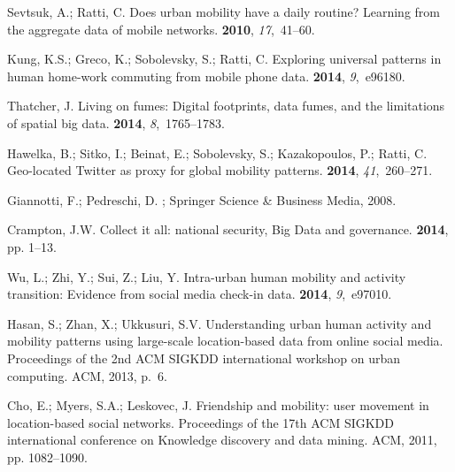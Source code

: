 \documentclass[ijgi,article,accept,moreauthors,pdftex,10pt,a4paper]{mdpi}
\theoremstyle{mdpi}
\newcounter{ex}
\newcounter{re}
\theoremstyle{mdpidefinition}
\begin{document}
\begin{thebibliography}{-------}
Sevtsuk, A.; Ratti, C.
\newblock Does urban mobility have a daily routine? Learning from the aggregate
  data of mobile networks.
 {\bf 2010}, {\em 17},~41--60.

Kung, K.S.; Greco, K.; Sobolevsky, S.; Ratti, C.
\newblock Exploring universal patterns in human home-work commuting from mobile
  phone data.
 {\bf 2014}, {\em 9},~e96180.

Thatcher, J.
\newblock Living on fumes: Digital footprints, data fumes, and the limitations
  of spatial big data.
 {\bf 2014}, {\em
  8},~1765--1783.

Hawelka, B.; Sitko, I.; Beinat, E.; Sobolevsky, S.; Kazakopoulos, P.; Ratti, C.
\newblock Geo-located Twitter as proxy for global mobility patterns.
 {\bf 2014}, {\em
  41},~260--271.

Giannotti, F.; Pedreschi, D.
; Springer Science \& Business Media,  2008.

Crampton, J.W.
\newblock Collect it all: national security, Big Data and governance.
 {\bf 2014}, pp. 1--13.

Wu, L.; Zhi, Y.; Sui, Z.; Liu, Y.
\newblock Intra-urban human mobility and activity transition: Evidence from
  social media check-in data.
 {\bf 2014}, {\em 9},~e97010.

Hasan, S.; Zhan, X.; Ukkusuri, S.V.
\newblock Understanding urban human activity and mobility patterns using
  large-scale location-based data from online social media.
\newblock  Proceedings of the 2nd ACM SIGKDD international workshop on urban
  computing. ACM,  2013, p.~6.

Cho, E.; Myers, S.A.; Leskovec, J.
\newblock Friendship and mobility: user movement in location-based social
  networks.
\newblock  Proceedings of the 17th ACM SIGKDD international conference on
  Knowledge discovery and data mining. ACM,  2011, pp. 1082--1090.


\end{thebibliography}
\end{document}
